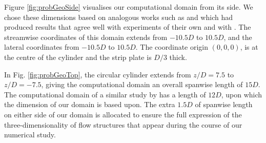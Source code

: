 \documentclass[oneside]{utmthesis}
\let\cite\citep
\begin{document}
Figure \ref{fig:probGeoSide} visualises our computational domain from its side. We chose these dimensions based on analogous works such as \cite{Maruai2017} and \cite{Maruai2018} which had produced results that agree well with experiments of their own and with \citet{Kawabata2013}. The streamwise coordinates of this domain extends from $-10.5D$ to $10.5D$, and the lateral coordinates from $-10.5D$ to $10.5D$. The coordinate origin $(0,0,0)$, is at the centre of the cylinder and the strip plate is $D/3$ thick.

In Fig. \ref{fig:probGeoTop}, the circular cylinder extends from $z/D=7.5$ to $z/D=-7.5$, giving the computational domain an overall spanwise length of $15D$. The computational domain of a similar study by \citet{Deng2007} has a length of $12D$, upon which the dimension of our domain is based upon. The extra $1.5D$ of spanwise length on either side of our domain is allocated to ensure the full expression of the three-dimensionality of flow structures that appear during the course of our numerical study.
\end{document}
